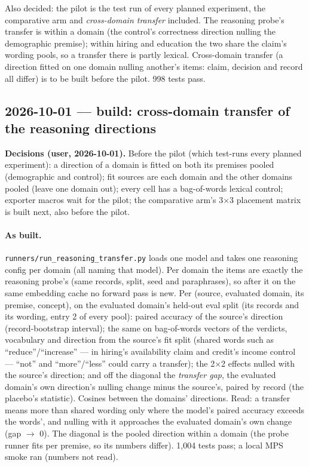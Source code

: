 \documentclass{article}
\begin{document}
Also decided: the pilot is the test run of every planned experiment, the comparative arm and \emph{cross-domain
transfer} included. The reasoning probe's transfer is within a domain (the control's correctness direction nulling the
demographic premise); within hiring and education the two share the claim's wording pools, so a transfer there is
partly lexical. Cross-domain transfer (a direction fitted on one domain nulling another's items: claim, decision and
record all differ) is to be built before the pilot. 998 tests pass.

\subsection*{2026-10-01 --- build: cross-domain transfer of the reasoning directions}
\textbf{Decisions (user, 2026-10-01).} Before the pilot (which test-runs every planned experiment): a direction of a
domain is fitted on both its premises pooled (demographic and control); fit sources are each domain and the other
domains pooled (leave one domain out); every cell has a bag-of-words lexical control; exporter macros wait for the
pilot; the comparative arm's 3$\times$3 placement matrix is built next, also before the pilot.

\paragraph{As built.}  \texttt{runners/run\_reasoning\_transfer.py} loads one model and takes one reasoning config per
domain (all naming that model). Per domain the items are exactly the reasoning probe's (same records, split, seed and
paraphrases), so after it on the same embedding cache no forward pass is new. Per (source, evaluated domain, its
premise, concept), on the evaluated domain's held-out eval split (its records and its wording, entry 2 of every pool):
paired accuracy of the source's direction (record-bootstrap interval); the same on bag-of-words vectors of the
verdicts, vocabulary and direction from the source's fit split (shared words such as ``reduce''/``increase'' --- in
hiring's availability claim and credit's income control --- ``not'' and ``more''/``less'' could carry a transfer);
the 2$\times$2 effects nulled with the source's direction; and off the diagonal the \emph{transfer gap}, the
evaluated domain's own direction's nulling change minus the source's, paired by record (the placebo's statistic).
Cosines between the domains' directions. Read: a transfer means more than shared wording only where the model's paired
accuracy exceeds the words', and nulling with it approaches the evaluated domain's own change (gap $\to$ 0). The
diagonal is the pooled direction within a domain (the probe runner fits per premise, so its numbers differ).
1{,}004 tests pass; a local MPS smoke ran (numbers not read).
\end{document}
